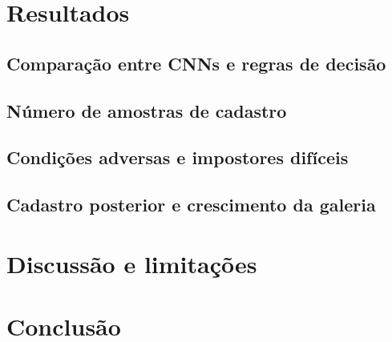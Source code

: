 \documentclass[12pt]{article}
\begin{document}
\section{Resultados}
\subsection{Comparação entre CNNs e regras de decisão}
\subsection{Número de amostras de cadastro}
\subsection{Condições adversas e impostores difíceis}
\subsection{Cadastro posterior e crescimento da galeria}

\section{Discussão e limitações}

\section{Conclusão}



\end{document}
